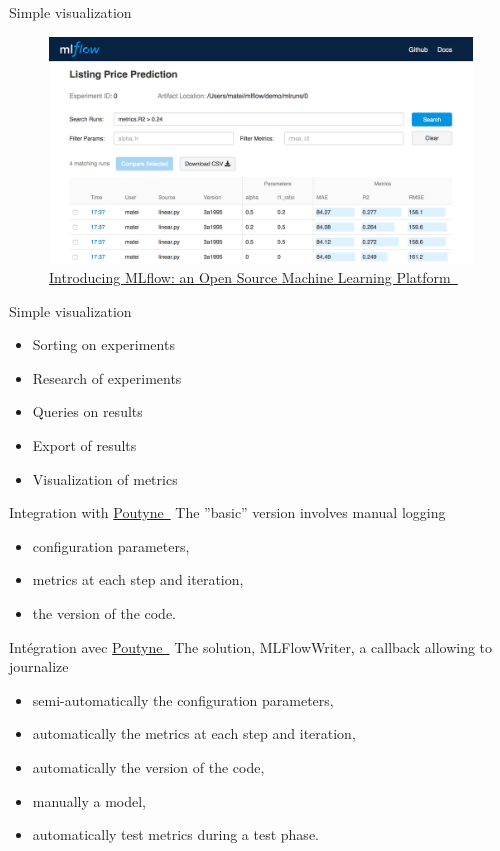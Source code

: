 \documentclass[aspectratio=169,10pt,xcolor=x11names,english,french]{beamer}
\newcommand{\link}[2]{\href{#1}{#2~{\smaller\faExternalLink*}}}
\begin{document}
	\begin{frame}{Simple visualization}
		\centering
		\begin{figure}
			\includegraphics[width=\linewidth,keepaspectratio, height=0.7\textheight]{img/mlflow-ui.png}
			\caption{\link{https://databricks.com/blog/2018/06/05/introducing-mlflow-an-open-source-machine-learning-platform.html}{Introducing MLflow: an Open Source Machine Learning Platform}}
		\end{figure}
	\end{frame}

	\begin{frame}{Simple visualization}
		\begin{itemize}
			\item Sorting on experiments
			\item Research of experiments
			\item Queries on results
			\item Export of results
			\item Visualization of metrics
		\end{itemize}
	\end{frame}


	\begin{frame}{Integration with \link{https://poutyne.org/}{Poutyne}}
		The ''basic'' version involves manual logging 
		\begin{itemize}
			\item configuration parameters,
			\item metrics at each step and iteration,
			\item the version of the code.
		\end{itemize}
	\end{frame}

	\begin{frame}{Intégration avec \link{https://poutyne.org/}{Poutyne}}
		The solution, \color{bleu}MLFlowWriter\color{couleurpolice}, a callback allowing to journalize
		\begin{itemize}
			\item semi-automatically the configuration parameters,
			\item automatically the metrics at each step and iteration,
			\item automatically the version of the code,
			\item manually a model,
			\item automatically test metrics during a test phase.
		\end{itemize}
	\end{frame}
\end{document}
